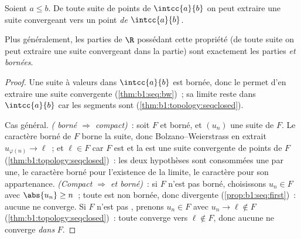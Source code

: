 \begin{theorem}\label{thm:b1:topology:compact}
Soient $a \leq b$. De toute suite de points de $\intcc{a}{b}$ on peut
extraire une suite convergeant vers un point \emph{de}
$\intcc{a}{b}$.

Plus généralement, les parties de $\R$ possédant cette propriété (de
toute suite on peut extraire une suite convergeant dans la partie)
sont exactement les parties \emph{ et bornées}.
\end{theorem}

\begin{proof}
Une suite à valeurs dans $\intcc{a}{b}$ est bornée, donc le
 permet d'en
extraire une suite convergente (\cref{thm:b1:seq:bw})~; sa limite reste
dans $\intcc{a}{b}$ car les segments sont
(\cref{thm:b1:topology:seqclosed}).

Cas général. \emph{( borné $\Rightarrow$ compact)}~: soit
$F$  et borné, et $(u_n)$ une suite de $F$. Le caractère
borné de $F$ borne la suite, donc Bolzano--Weierstrass en extrait
$u_{\varphi(n)} \to \ell$~; et $\ell \in F$ car $F$ est  et
la  est une suite convergente de points de $F$
(\cref{thm:b1:topology:seqclosed})~: les deux hypothèses sont
consommées une par une, le caractère borné pour l'existence de la
limite, le caractère  pour son appartenance.
\emph{(Compact $\Rightarrow$  et borné)}~: si $F$ n'est pas
borné, choisissons $u_n \in F$ avec $\abs{u_n} \geq n$~; toute
 est non bornée, donc divergente
(\cref{prop:b1:seq:first})~: aucune  ne converge. Si $F$
n'est pas , prenons $u_n \in F$ avec $u_n \to \ell \notin F$
(\cref{thm:b1:topology:seqclosed})~: toute  converge
vers $\ell \notin F$, donc aucune  ne converge
\emph{dans} $F$.
\end{proof}

